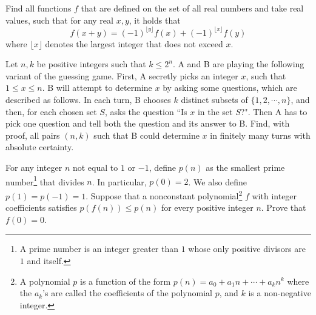 \documentclass{qmo}
\begin{document}
\begin{problem}
    Find all functions $f$ that are defined on the set of all real numbers and take real values, such that for any real $x,y$, it holds that $$f(x + y) = (-1)^{\lfloor y \rfloor} f(x) + (-1)^{\lfloor x \rfloor} f(y)$$ where $\lfloor x \rfloor$ denotes the largest integer that does not exceed $x$.
\end{problem}
\begin{problem}
    Let $n,k$ be positive integers such that $k\leq 2^n$. A and B are playing the following variant of the guessing game. First, A secretly picks an integer $x$, such that $1\leq x\leq n$. B will attempt to determine $x$ by asking some questions, which are described as follows. In each turn, B chooses $k$ distinct subsets of $\{1, 2, \cdots, n\}$, and then, for each chosen set $S$, asks the question ``Is $x$ in the set $S$?". Then A has to pick one question and tell both the question and its answer to B.\nl
    Find, with proof, all pairs $(n,k)$ such that B could determine $x$ in finitely many turns with absolute certainty.
\end{problem}
\begin{problem}
    For any integer $n$ not equal to $1$ or $-1$, define $p(n)$ as the smallest prime number\footnote{A prime number is an integer greater than $1$ whose only positive divisors are $1$ and itself.} that divides $n$. In particular, $p(0)=2$. We also define $p(1) = p(-1) = 1$. Suppose that a nonconstant polynomial\footnote{A polynomial $p$ is a function of the form $p(n) = a_0 + a_1 n + \cdots + a_k n^k$ where the $a_k$'s are called the coefficients of the polynomial $p$, and $k$ is a non-negative integer.} $f$ with integer coefficients satisfies $p(f(n)) \leq p(n)$ for every positive integer $n$. Prove that $f(0)=0$. 
\end{problem}
\end{document}
